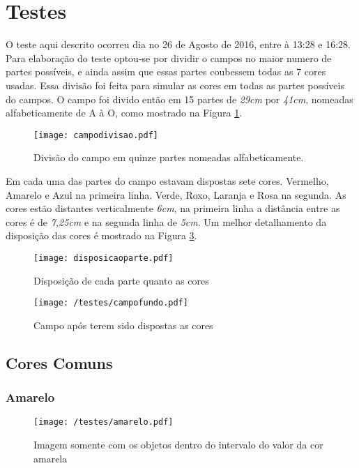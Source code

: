  \section{Testes}
O teste aqui descrito ocorreu dia no 26 de Agosto de 2016, entre à 13:28 e 16:28.
Para elaboração do teste optou-se por dividir o campos no maior numero de partes possíveis, e ainda assim que essas partes coubessem todas as 7 cores usadas. Essa divisão foi feita para simular as cores em todas as partes possíveis do campos. O campo foi divido então em 15 partes de \textit{29cm} por \textit{41cm}, nomeadas alfabeticamente de A à O, como mostrado na Figura \ref{campodivisao}.

\begin{figure}[H]
		\centering
		\texttt{[image: campodivisao.pdf]}
		\caption{Divisão do campo em quinze partes nomeadas alfabeticamente.}
		\label{campodivisao}
	\end{figure}
	
Em cada uma das partes do campo estavam dispostas sete cores. Vermelho, Amarelo e Azul na primeira linha. Verde, Roxo, Laranja e Rosa na segunda. As cores estão distantes verticalmente \textit{6cm}, na primeira linha a distância entre as cores é de \textit{7,25cm} e na segunda linha de \textit{5cm}. Um  melhor detalhamento da disposição das cores é mostrado na Figura \ref{disposicaoparte}.


\begin{figure}[H]
\begin{minipage}[b]{0.45\linewidth}
\centering
\texttt{[image: disposicaoparte.pdf]}
\caption{Disposição de cada parte quanto as cores}
\label{fig:figure1}
\end{minipage}
\hspace{0.5cm}
\begin{minipage}[b]{0.45\linewidth}
\centering
\texttt{[image: /testes/campofundo.pdf]}
\caption{Campo após terem sido dispostas as cores}
\label{fig:figure2}
\end{minipage}
\end{figure}

\subsection{Cores Comuns}
\subsubsection{Amarelo}
	\begin{figure}[H]
		\centering
		\texttt{[image: /testes/amarelo.pdf]}
		\caption{Imagem somente com os objetos dentro do intervalo do valor da cor amarela}
		\label{disposicaoparte}
	\end{figure}
	
